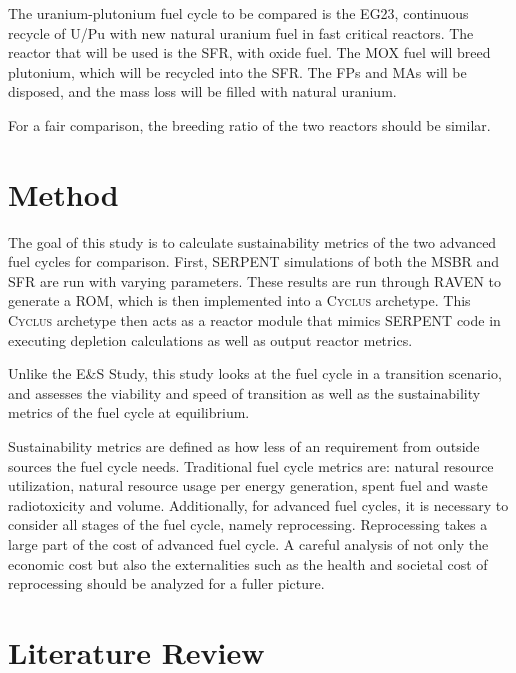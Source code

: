 \documentclass{article}
\newcommand{\Cyclus}{\textsc{Cyclus}\xspace}%
\begin{document}
The uranium-plutonium fuel cycle to be compared is the 
EG23, continuous recycle of U/Pu with new natural uranium
fuel in fast critical reactors. The reactor that will be used
is the \gls{SFR}, with oxide fuel. The \gls{MOX} fuel will 
breed plutonium, which will be recycled into the \gls{SFR}.
The \glspl{FP} and \glspl{MA} will be disposed, and the 
mass loss will be filled with natural uranium.

For a fair comparison, the breeding ratio of the two
reactors should be similar.

\section{Method}

The goal of this study is to calculate sustainability
metrics of the two advanced fuel cycles for comparison.
First, SERPENT simulations of both the \gls{MSBR} and \gls{SFR}
are run with varying parameters. These results are run
through RAVEN \cite{rabiti_mathematical_2013} to generate
a \gls{ROM}, which is then implemented into a \Cyclus
archetype. This \Cyclus archetype then acts as a reactor
module that mimics SERPENT code in executing depletion
calculations as well as output reactor metrics.

Unlike the E\&S Study, this study looks at the 
fuel cycle in a transition scenario, and assesses
the viability and speed of transition as well as
the sustainability metrics of the fuel cycle at equilibrium.

Sustainability metrics are defined as how less of an requirement
from outside sources the fuel cycle needs. Traditional fuel cycle
metrics are: natural resource utilization, natural resource
usage per energy generation, spent fuel and waste radiotoxicity
and volume.  Additionally, for advanced fuel cycles,
it is necessary to consider all stages of the fuel cycle,
namely reprocessing. Reprocessing takes a large part of the 
cost of advanced fuel cycle. A careful analysis of not only
the economic cost but also the externalities such as the health and societal cost of 
reprocessing should be analyzed for a fuller picture.


\section{Literature Review}
\end{document}
